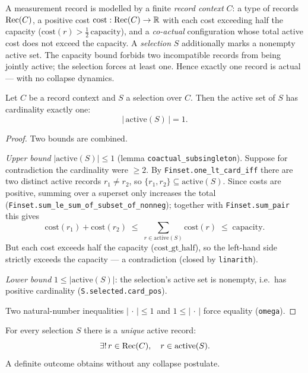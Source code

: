 A measurement record is modelled by a finite \emph{record context} $C$: a type of
records $\mathrm{Rec}(C)$, a positive cost $\mathrm{cost}: \mathrm{Rec}(C)\to\mathbb{R}$ with each
cost exceeding half the capacity ($\mathrm{cost}(r) > \tfrac12\,\mathrm{capacity}$),
and a \emph{co-actual} configuration whose total active cost does not exceed the
capacity. A \emph{selection} $S$ additionally marks a nonempty active set. The
capacity bound forbids two incompatible records from being jointly active; the
selection forces at least one. Hence exactly one record is actual --- with no
collapse dynamics.

\begin{theorem}
  \label{thm:exactly-one-actual}
  \leanok
  Let $C$ be a record context and $S$ a selection over $C$. Then the active set of
  $S$ has cardinality exactly one:
  \[
    \bigl|\, \mathrm{active}(S) \,\bigr| = 1 .
  \]
\end{theorem}

\begin{proof}
  \leanok
  Two bounds are combined.

  \emph{Upper bound} $|\mathrm{active}(S)| \le 1$ (lemma
  \texttt{coactual\_subsingleton}). Suppose for contradiction the cardinality were
  $\ge 2$. By \texttt{Finset.one\_lt\_card\_iff} there are two distinct active records
  $r_1 \ne r_2$, so $\{r_1,r_2\} \subseteq \mathrm{active}(S)$. Since costs are
  positive, summing over a superset only increases the total
  (\texttt{Finset.sum\_le\_sum\_of\_subset\_of\_nonneg}); together with
  \texttt{Finset.sum\_pair} this gives
  \[
    \mathrm{cost}(r_1) + \mathrm{cost}(r_2)
      \;\le\; \sum_{r \in \mathrm{active}(S)} \mathrm{cost}(r)
      \;\le\; \mathrm{capacity}.
  \]
  But each cost exceeds half the capacity ($\mathrm{cost\_gt\_half}$), so the
  left-hand side strictly exceeds the capacity --- a contradiction
  (closed by \texttt{linarith}).

  \emph{Lower bound} $1 \le |\mathrm{active}(S)|$: the selection's active set is
  nonempty, i.e.\ has positive cardinality (\texttt{S.selected.card\_pos}).

  Two natural-number inequalities $|\,\cdot\,| \le 1$ and $1 \le |\,\cdot\,|$ force
  equality (\texttt{omega}).
\end{proof}

\begin{corollary}
  \label{thm:single-outcome}
  \leanok
  For every selection $S$ there is a \emph{unique} active record:
  \[
    \exists!\, r \in \mathrm{Rec}(C), \quad r \in \mathrm{active}(S).
  \]
  A definite outcome obtains without any collapse postulate.
\end{corollary}

